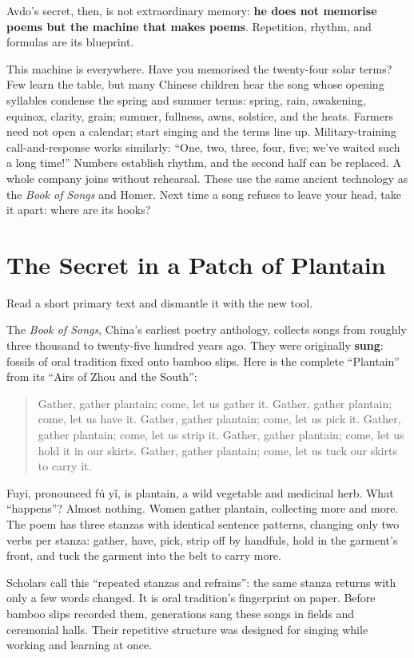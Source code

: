Avdo's secret, then, is not extraordinary memory: \textbf{he does not memorise poems but the machine that makes poems}. Repetition, rhythm, and formulas are its blueprint.

This machine is everywhere. Have you memorised the twenty-four solar terms? Few learn the table, but many Chinese children hear the song whose opening syllables condense the spring and summer terms: spring, rain, awakening, equinox, clarity, grain; summer, fullness, awns, solstice, and the heats. Farmers need not open a calendar; start singing and the terms line up. Military-training call-and-response works similarly: ``One, two, three, four, five; we've waited such a long time!'' Numbers establish rhythm, and the second half can be replaced. A whole company joins without rehearsal. These use the same ancient technology as the \emph{Book of Songs} and Homer. Next time a song refuses to leave your head, take it apart: where are its hooks?

\section{The Secret in a Patch of Plantain}
Read a short primary text and dismantle it with the new tool.

The \emph{Book of Songs}, China's earliest poetry anthology, collects songs from roughly three thousand to twenty-five hundred years ago. They were originally \textbf{sung}: fossils of oral tradition fixed onto bamboo slips. Here is the complete ``Plantain'' from its ``Airs of Zhou and the South'':

\begin{quote}
Gather, gather plantain; come, let us gather it. Gather, gather plantain; come, let us have it. Gather, gather plantain; come, let us pick it. Gather, gather plantain; come, let us strip it. Gather, gather plantain; come, let us hold it in our skirts. Gather, gather plantain; come, let us tuck our skirts to carry it.
\end{quote}
Fuyi, pronounced fú yǐ, is plantain, a wild vegetable and medicinal herb. What ``happens''? Almost nothing. Women gather plantain, collecting more and more. The poem has three stanzas with identical sentence patterns, changing only two verbs per stanza: gather, have, pick, strip off by handfuls, hold in the garment's front, and tuck the garment into the belt to carry more.

Scholars call this ``repeated stanzas and refrains'': the same stanza returns with only a few words changed. It is oral tradition's fingerprint on paper. Before bamboo slips recorded them, generations sang these songs in fields and ceremonial halls. Their repetitive structure was designed for singing while working and learning at once.

